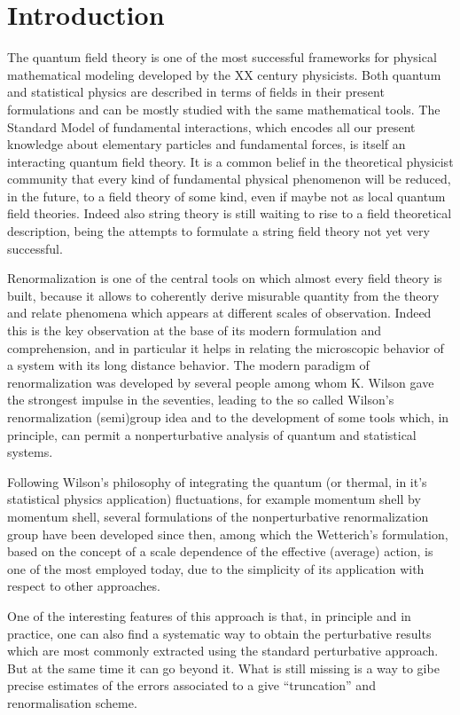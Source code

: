 \chapter*{Introduction}
\noindent
The quantum field theory is one of the most successful frameworks for physical mathematical modeling
developed by the XX century physicists. 
Both quantum and statistical physics are described in terms of fields in their present formulations and can be mostly studied with the same mathematical tools.
The Standard Model of fundamental interactions, which encodes all our present knowledge about elementary particles and fundamental forces, is itself an interacting quantum field theory.
It is a common belief in the theoretical physicist community that every kind of fundamental physical
phenomenon will be reduced,  in the future, to a field theory of some kind, even if maybe not as local quantum field theories.
Indeed also string theory is still waiting to rise to a field theoretical description, being the attempts to formulate a string field theory not yet very successful.

Renormalization is one of the central tools on which almost every field theory is built, because it allows to coherently derive misurable quantity from the theory and relate phenomena which appears at different scales of observation.
Indeed this is the key observation at the base of its modern formulation and comprehension, and in particular it helps in relating the microscopic behavior of a system with its long distance behavior.
The modern paradigm of renormalization was developed by several people among whom K. Wilson gave the strongest impulse in the seventies, leading to the so called Wilson's renormalization (semi)group idea and to the development of some tools which, in principle, can permit a nonperturbative analysis of quantum and statistical systems.

Following Wilson's philosophy of integrating the quantum (or thermal, in it's statistical physics application) fluctuations, for example momentum shell by momentum shell, several formulations of the nonperturbative renormalization group have been developed since then, among which the Wetterich's formulation, based on the concept of a scale dependence of the effective (average) action, is one of the most employed today, due to the simplicity of its application with respect to other
approaches.

One of the interesting features of this approach is that, in principle and in practice, one can also find a systematic way to obtain the perturbative results which are most commonly extracted using the standard perturbative approach. But at the same time it can go beyond it. What is still missing is a way to gibe precise estimates of the errors associated to a give ``truncation'' and renormalisation scheme.

